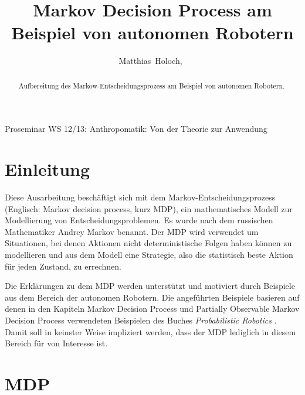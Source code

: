 \documentclass[a4paper]{IEEEtran}
\begin{document}
\title{Markov Decision Process am Beispiel von autonomen Robotern} %

\author{Matthias~Holoch,~}%




%
{Proseminar WS 12/13: Anthropomatik: Von der Theorie zur Anwendung}



\maketitle


\begin{abstract}
Aufbereitung des Markow-Entscheidungsprozess am Beispiel von autonomen Robotern. 
\end{abstract}


\section{Einleitung}
Diese Ausarbeitung beschäftigt sich mit dem Markov-Entscheidungsprozess (Englisch: Markov decision process, kurz MDP), ein mathematisches Modell zur Modellierung von Entscheidungsproblemen. Es wurde nach dem russischen Mathematiker Andrey Markov benannt. Der MDP wird verwendet um Situationen, bei denen Aktionen nicht deterministische Folgen haben können zu modellieren und aus dem Modell eine Strategie, also die statistisch beste Aktion für jeden Zustand, zu errechnen.

Die Erklärungen zu dem MDP werden unterstützt und motiviert durch Beispiele aus dem Bereich der autonomen Robotern. Die angeführten Beispiele basieren auf denen in den Kapiteln Markov Decision Process und Partially Observable Markov Decision Process verwendeten Beispielen des Buches \emph{Probabilistic Robotics} \cite{PR_ThrunBurgardFox}. Damit soll in keinster Weise impliziert werden, dass der MDP lediglich in diesem Bereich für von Interesse ist.


\section{MDP}
\end{document}
